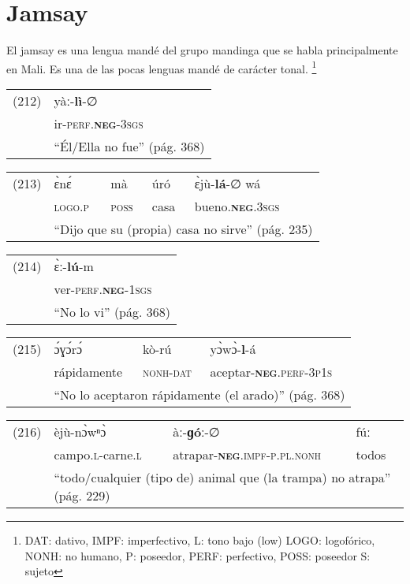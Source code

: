 \section*{Jamsay}

\noindent El jamsay es una lengua mandé del grupo mandinga que se habla principalmente en Mali. Es una de las pocas lenguas mandé de carácter tonal. 
\footnote{DAT: dativo, IMPF: imperfectivo, L: tono bajo (low) LOGO: logofórico, NONH: no humano, P: poseedor, PERF: perfectivo, POSS: poseedor S: sujeto}
\vspace{0.5cm}

{\setmainfont{Charis SIL} 

\begin{tabular}{ll}
(212) & yàː-\textbf{lì}-∅ \\
& ir-\textsc{perf.\textbf{neg}-3sgs} \\
& ``Él/Ella no fue'' (pág. 368)
\end{tabular} \vspace{0.5cm}

\begin{tabular}{llllll}
(213) & ɛ̀nɛ́ & mà & úró & ɛ̀jù-\textbf{lá}-∅ wá \\
& \textsc{logo.p} & \textsc{poss} & casa & bueno.\textsc{\textbf{neg}.3sgs} \\
& \multicolumn{5}{l}{``Dijo que su (propia) casa no sirve'' (pág. 235)}
\end{tabular} \vspace{0.5cm}

\begin{tabular}{ll}
(214) & ɛ̀ː-\textbf{lú}-m \\
& ver-\textsc{perf.\textbf{neg}-1sgs}\\
& ``No lo vi'' (pág. 368)
\end{tabular} \vspace{0.5cm}

\begin{tabular}{llll}
(215) & ɔ́ɣɔ́rɔ́ & kò-rú & yɔ̀wɔ̀-\textbf{l}-á \\
& rápidamente & \textsc{nonh-dat} & aceptar-\textsc{\textbf{neg}.perf-3p1s} \\
& \multicolumn{3}{l}{``No lo aceptaron rápidamente (el arado)'' (pág. 368)}
\end{tabular} \vspace{0.5cm}

\begin{tabular}{llll}
(216) & èjù-nɔ̀wⁿɔ̀ & àː-\textbf{ɡóː}-∅ & fúː \\
& campo.\textsc{l}-carne.\textsc{l} & atrapar-\textsc{\textbf{neg}.impf-p.pl.nonh} & todos \\
& \multicolumn{3}{l}{``todo/cualquier (tipo de) animal que (la trampa) no atrapa'' (pág. 229)}
\end{tabular} \vspace{0.5cm}

}

